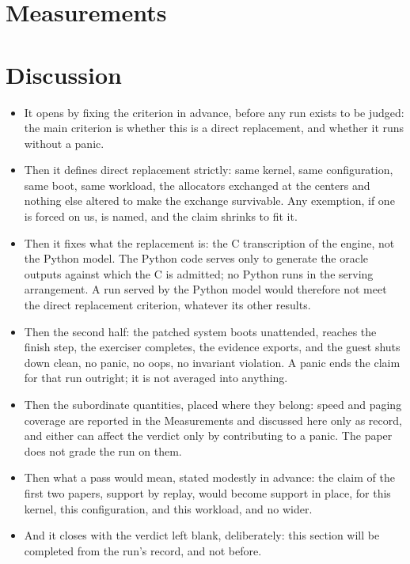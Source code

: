 \documentclass[11pt]{article}
\begin{document}
\section{Measurements}

\section{Discussion}

\begin{itemize}
\item It opens by fixing the criterion in advance, before any run exists to be judged: the main criterion is whether this is a direct replacement, and whether it runs without a panic.
\item Then it defines direct replacement strictly: same kernel, same configuration, same boot, same workload, the allocators exchanged at the centers and nothing else altered to make the exchange survivable. Any exemption, if one is forced on us, is named, and the claim shrinks to fit it.
\item Then it fixes what the replacement is: the C transcription of the engine, not the Python model. The Python code serves only to generate the oracle outputs against which the C is admitted; no Python runs in the serving arrangement. A run served by the Python model would therefore not meet the direct replacement criterion, whatever its other results.
\item Then the second half: the patched system boots unattended, reaches the finish step, the exerciser completes, the evidence exports, and the guest shuts down clean, no panic, no oops, no invariant violation. A panic ends the claim for that run outright; it is not averaged into anything.
\item Then the subordinate quantities, placed where they belong: speed and paging coverage are reported in the Measurements and discussed here only as record, and either can affect the verdict only by contributing to a panic. The paper does not grade the run on them.
\item Then what a pass would mean, stated modestly in advance: the claim of the first two papers, support by replay, would become support in place, for this kernel, this configuration, and this workload, and no wider.
\item And it closes with the verdict left blank, deliberately: this section will be completed from the run's record, and not before.
\end{itemize}
\end{document}
